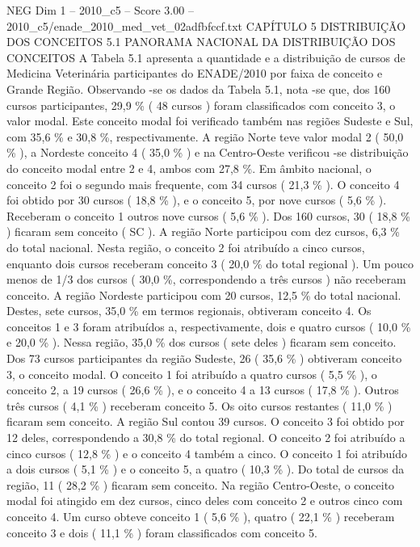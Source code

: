 \begin{textsample}{NEG Dim 1 – 2010\_c5 – Score 3.00 – 2010\_c5/enade\_2010\_med\_vet\_02adfbfccf.txt}  \label{ex:f1_neg_307}
CAPÍTULO 5 DISTRIBUIÇÃO DOS CONCEITOS 5.1 PANORAMA NACIONAL DA DISTRIBUIÇÃO DOS CONCEITOS A Tabela 5.1 apresenta a quantidade e a distribuição de cursos de Medicina Veterinária participantes do ENADE/2010 por faixa de conceito e Grande Região.
Observando -se os dados da Tabela 5.1, nota -se que, dos 160 cursos participantes, 29,9 \% ( 48 cursos ) foram classificados com conceito 3, o valor modal.
Este conceito modal foi verificado também nas regiões Sudeste e Sul, com 35,6 \% e 30,8 \%, respectivamente.
A região Norte teve valor modal 2 ( 50,0 \% ), a Nordeste conceito 4 ( 35,0 \% ) e na Centro-Oeste verificou -se distribuição do conceito modal entre 2 e 4, ambos com 27,8 \%.
Em âmbito nacional, o conceito 2 foi o segundo mais frequente, com 34 cursos ( 21,3 \% ).
O conceito 4 foi obtido por 30 cursos ( 18,8 \% ), e o conceito 5, por nove cursos ( 5,6 \% ).
Receberam o conceito 1 outros nove cursos ( 5,6 \% ).
Dos 160 cursos, 30 ( 18,8 \% ) ficaram sem conceito ( SC ).
A região Norte participou com dez cursos, 6,3 \% do total nacional.
Nesta região, o conceito 2 foi atribuído a cinco cursos, enquanto dois cursos receberam conceito 3 ( 20,0 \% do total regional ).
Um pouco menos de 1/3 dos cursos ( 30,0 \%, correspondendo a três cursos ) não receberam conceito.
A região Nordeste participou com 20 cursos, 12,5 \% do total nacional.
Destes, sete cursos, 35,0 \% em termos regionais, obtiveram conceito 4.
Os conceitos 1 e 3 foram atribuídos a, respectivamente, dois e quatro cursos ( 10,0 \% e 20,0 \% ).
Nessa região, 35,0 \% dos cursos ( sete deles ) ficaram sem conceito.
Dos 73 cursos participantes da região Sudeste, 26 ( 35,6 \% ) obtiveram conceito 3, o conceito modal.
O conceito 1 foi atribuído a quatro cursos ( 5,5 \% ), o conceito 2, a 19 cursos ( 26,6 \% ), e o conceito 4 a 13 cursos ( 17,8 \% ).
Outros três cursos ( 4,1 \% ) receberam conceito 5.
Os oito cursos restantes ( 11,0 \% ) ficaram sem conceito.
A região Sul contou 39 cursos.
O conceito 3 foi obtido por 12 deles, correspondendo a 30,8 \% do total regional.
O conceito 2 foi atribuído a cinco cursos ( 12,8 \% ) e o conceito 4 também a cinco.
O conceito 1 foi atribuído a dois cursos ( 5,1 \% ) e o conceito 5, a quatro ( 10,3 \% ).
Do total de cursos da região, 11 ( 28,2 \% ) ficaram sem conceito.
Na região Centro-Oeste, o conceito modal foi atingido em dez cursos, cinco deles com conceito 2 e outros cinco com conceito 4.
Um curso obteve conceito 1 ( 5,6 \% ), quatro ( 22,1 \% ) receberam conceito 3 e dois ( 11,1 \% ) foram classificados com conceito 5.

\end{textsample}
